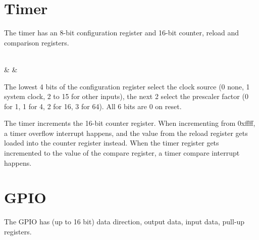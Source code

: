 \documentclass{book}
\begin{document}
\section{Timer}

The timer has an 8-bit configuration register and 16-bit counter, reload and comparison registers.

\vspace{3mm}
\begin{bytefield}[bitwidth=0.13\linewidth]{8}
	 \\
	 &  & 
\end{bytefield}

The lowest 4 bits of the configuration register select the clock source (0 none, 1 system clock, 2 to 15 for other inputs), the next 2 select the prescaler factor (0 for 1, 1 for 4, 2 for 16, 3 for 64). All 6 bits are 0 on reset.

The timer increments the 16-bit counter register. When incrementing from 0xffff, a timer overflow interrupt happens, and the value from the reload register gets loaded into the counter register instead. When the timer register gets incremented to the value of the compare register, a timer compare interrupt happens.

\section{GPIO}

The GPIO has (up to 16 bit) data direction, output data, input data, pull-up registers.
\end{document}
